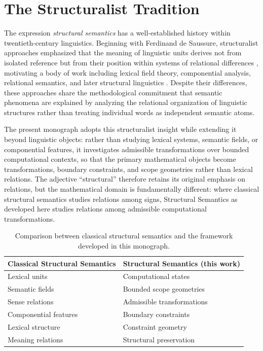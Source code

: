 \documentclass[11pt,twoside,openright]{book}
\numberwithin{equation}{chapter}
\theoremstyle{definition}
\theoremstyle{plain}
\theoremstyle{remark}
\theoremstyle{definition}
\begin{document}
\section{The Structuralist Tradition}
\label{sec:structuralist-tradition}

The expression \emph{structural semantics} has a well-established history
within twentieth-century linguistics. Beginning with Ferdinand de
Saussure, structuralist approaches emphasized that the meaning of
linguistic units derives not from isolated reference but from their
position within systems of relational differences \cite{Saussure1916},
motivating a body of work including lexical field theory, componential
analysis, relational semantics, and later structural linguistics
\cite{Lyons1977,Greimas1966,Hjelmslev1961,Coseriu1977}. Despite their
differences, these approaches share the methodological commitment that
semantic phenomena are explained by analyzing the relational organization
of linguistic structures rather than treating individual words as
independent semantic atoms.

The present monograph adopts this structuralist insight while extending
it beyond linguistic objects: rather than studying lexical systems,
semantic fields, or componential features, it investigates admissible
transformations over bounded computational contexts, so that the primary
mathematical objects become transformations, boundary constraints, and
scope geometries rather than lexical relations. The adjective
``structural'' therefore retains its original emphasis on relations, but
the mathematical domain is fundamentally different: where classical
structural semantics studies relations among signs, Structural Semantics
as developed here studies relations among admissible computational
transformations.

\begin{table}[ht]
\centering
\begin{tabular}{ll}
\toprule
Classical Structural Semantics & Structural Semantics (this work) \\
\midrule
Lexical units & Computational states \\
Semantic fields & Bounded scope geometries \\
Sense relations & Admissible transformations \\
Componential features & Boundary constraints \\
Lexical structure & Constraint geometry \\
Meaning relations & Structural preservation \\
\bottomrule
\end{tabular}
\caption{Comparison between classical structural semantics and the
framework developed in this monograph.}
\end{table}
\end{document}
